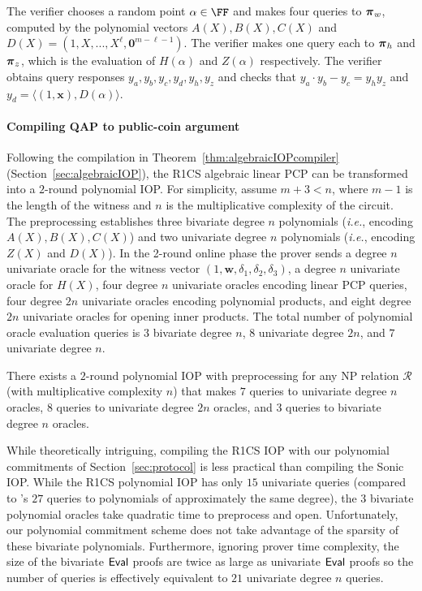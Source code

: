 The verifier chooses a random point $\alpha \in \FF$ and makes four queries to $\boldsymbol{\pi}_w$, computed by the polynomial vectors $A(X), B(X), C(X)$ and $D(X) = (1, X,...,X^\ell, \mathbf{0}^{m- \ell -1})$. The verifier makes one query each to $\boldsymbol{\pi}_h$ and $\boldsymbol{\pi}_z$, which is the evaluation of $H(\alpha)$ and $Z(\alpha)$ respectively. The verifier obtains query responses $y_a, y_b, y_c, y_d, y_h, y_z$ and checks that $y_a \cdot y_b - y_c = y_h y_z$ and $y_d = \langle (1, \mathbf{x}), D(\alpha) \rangle$. 

\paragraph{Compiling QAP to public-coin argument} 

Following the compilation in Theorem~\ref{thm:algebraicIOPcompiler} (Section~\ref{sec:algebraicIOP}), the R1CS algebraic linear PCP can be transformed into a $2$-round polynomial IOP. For simplicity, assume $m+3 < n$, where $m-1$ is the length of the witness and $n$ is the multiplicative complexity of the circuit. The preprocessing establishes three bivariate degree $n$ polynomials (\emph{i.e.}, encoding $A(X), B(X), C(X)$) and two univariate degree $n$ polynomials (\emph{i.e.}, encoding $Z(X)$ and $D(X)$). In the 2-round online phase the prover sends a degree $n$ univariate oracle for the witness vector $(1, \mathbf{w}, \delta_1, \delta_2, \delta_3)$, a degree $n$ univariate oracle for $H(X)$, four degree $n$ univariate oracles encoding linear PCP queries, four degree $2n$ univariate oracles encoding polynomial products, and eight degree $2n$ univariate oracles for opening inner products. The total number of polynomial oracle evaluation queries is $3$ bivariate degree $n$, $8$ univariate degree $2n$, and $7$ univariate degree $n$.

\begin{theorem}
There exists a $2$-round polynomial IOP with preprocessing for any NP relation $\mathcal{R}$ (with multiplicative complexity $n$) that makes $7$ queries to univariate degree $n$ oracles, $8$ queries to univariate degree $2n$ oracles, and $3$ queries to bivariate degree $n$ oracles.  
\end{theorem}
 
While theoretically intriguing, compiling the R1CS IOP with our polynomial commitments of Section~\ref{sec:protocol} is less practical than compiling the \textsf{Sonic} IOP. While the R1CS polynomial IOP has only $15$ univariate queries (compared to 's $27$ queries to polynomials of approximately the same degree), the $3$ bivariate polynomial oracles take quadratic time to preprocess and open. Unfortunately, our polynomial commitment scheme does not take advantage of the sparsity of these bivariate polynomials. Furthermore, ignoring prover time complexity, the size of the bivariate $\textsf{{Eval}}$ proofs are twice as large as univariate $\textsf{{Eval}}$ proofs so the number of queries is effectively equivalent to $21$ univariate degree $n$ queries. 




